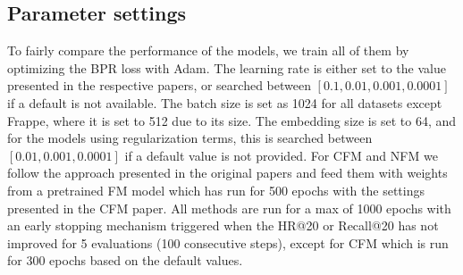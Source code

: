 \subsection{Parameter settings}
To fairly compare the performance of the models, we train all of them by optimizing the BPR loss with Adam.
The learning rate is either set to the value presented in the respective papers, or searched between $[0.1, 0.01, 0.001, 0.0001]$ if a default is not available.
The batch size is set as 1024 for all datasets except Frappe, where it is set to 512 due to its size.
The embedding size is set to 64, and for the models using regularization terms, this is searched between $[0.01, 0.001, 0.0001]$ if a default value is not provided.
For CFM and NFM we follow the approach presented in the original papers and feed them with weights from a pretrained FM model which has run for 500 epochs with the settings presented in the CFM paper.
All methods are run for a max of 1000 epochs with an early stopping mechanism triggered when the HR@20 or Recall@20 has not improved for 5 evaluations (100 consecutive steps), except for CFM which is run for 300 epochs based on the default values.


